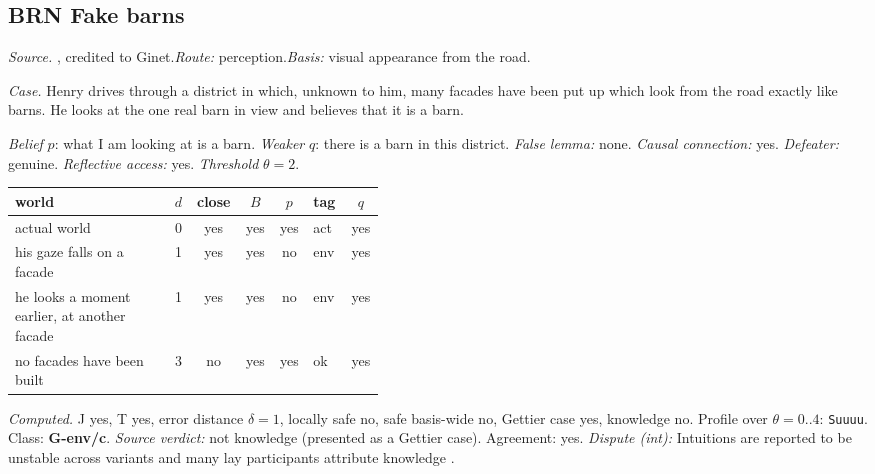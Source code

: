 \subsection*{BRN \enspace Fake barns}
\noindent\textit{Source.} \citet{Goldman1976}, credited to Ginet.\quad \textit{Route:} perception.\quad \textit{Basis:} visual appearance from the road.\par
\noindent\textit{Case.} Henry drives through a district in which, unknown to him, many facades have been put up which look from the road exactly like barns. He looks at the one real barn in view and believes that it is a barn.\par
\noindent\textit{Belief} $p$: what I am looking at is a barn.
 \textit{Weaker} $q$: there is a barn in this district.
 \textit{False lemma:} none. \textit{Causal connection:} yes. \textit{Defeater:} genuine. \textit{Reflective access:} yes. \textit{Threshold} $\theta = 2$.\par
\begin{center}\begin{tabular}{@{}p{0.43\linewidth}rccclc@{}}
world & $d$ & close & $B$ & $p$ & tag & $q$ \\ \midrule
actual world & 0 & yes & yes & yes & act & yes \\
his gaze falls on a facade & 1 & yes & yes & no & env & yes \\
he looks a moment earlier, at another facade & 1 & yes & yes & no & env & yes \\
no facades have been built & 3 & no & yes & yes & ok & yes \\
\end{tabular}\end{center}
\noindent\textit{Computed.} J yes, T yes, error distance $\delta = 1$, locally safe no, safe basis-wide no, Gettier case yes, knowledge no. Profile over $\theta = 0..4$: \texttt{Suuuu}. Class: \textbf{G-env/c}.
 \textit{Source verdict:} not knowledge (presented as a Gettier case). Agreement: yes.
 \textit{Dispute (int):} Intuitions are reported to be unstable across variants \citep{GendlerHawthorne2005} and many lay participants attribute knowledge \citep{Colaco2014}.
\par\medskip
{}
